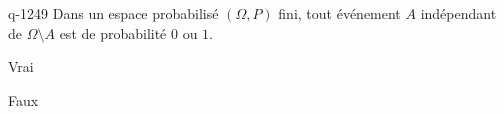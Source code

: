 \begin{truefalse}{q-1249}
Dans un espace probabilisé $(\Omega, P)$ fini, tout événement $A$ indépendant de $\Omega \setminus A$  est de probabilité $0$ ou $1$.
\item* Vrai
\item Faux
\end{truefalse}

